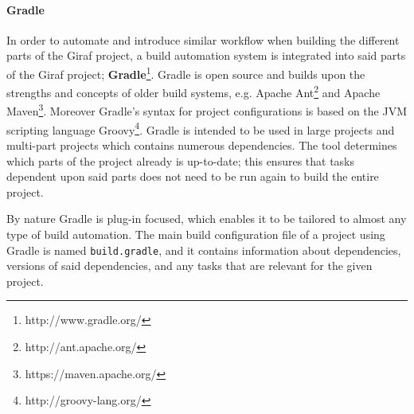 \paragraph{Gradle}
In order to automate and introduce similar workflow when building the different parts of the Giraf project, a build automation system is integrated into said parts of the Giraf project; \textbf{Gradle}\footnote{http://www.gradle.org/}.
Gradle is open source and builds upon the strengths and concepts of older build systems, e.g. Apache Ant\footnote{http://ant.apache.org/} and Apache Maven\footnote{https://maven.apache.org/}.
Moreover Gradle's syntax for project configurations is based on the JVM scripting language Groovy\footnote{http://groovy-lang.org/}.
Gradle is intended to be used in large projects and multi-part projects which contains numerous dependencies.
The tool determines which parts of the project already is up-to-date; this ensures that tasks dependent upon said parts does not need to be run again to build the entire project. 

By nature Gradle is plug-in focused, which enables it to be tailored to almost any type of build automation.
The main build configuration file of a project using Gradle is named \texttt{build.gradle}, and it contains information about dependencies, versions of said dependencies, and any tasks that are relevant for the given project.